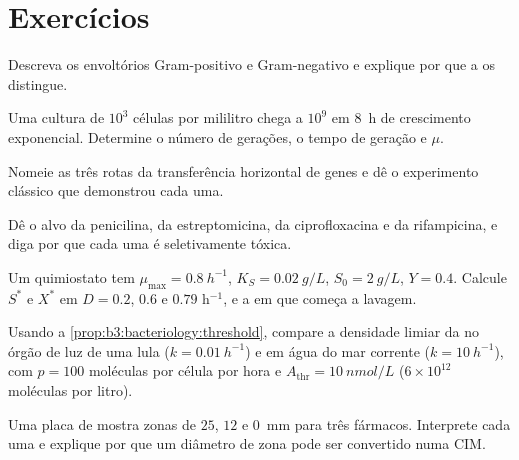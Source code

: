 \section{Exercícios}

\begin{exercise}[$\star$]\label{exo:b3:bacteriology:1}
Descreva os envoltórios Gram-positivo e Gram-negativo e explique por
que a  os distingue.
\end{exercise}

\begin{exercise}[$\star$]\label{exo:b3:bacteriology:2}
Uma cultura de $10^{3}$ células por mililitro chega a $10^{9}$ em
\qty{8}{h} de crescimento exponencial. Determine o número de gerações,
o tempo de geração e $\mu$.
\end{exercise}

\begin{exercise}[$\star$]\label{exo:b3:bacteriology:3}
Nomeie as três rotas da transferência horizontal de genes e dê o
experimento clássico que demonstrou cada uma.
\end{exercise}

\begin{exercise}[$\star$]\label{exo:b3:bacteriology:4}
Dê o alvo da penicilina, da estreptomicina, da ciprofloxacina e da
rifampicina, e diga por que cada uma é seletivamente tóxica.
\end{exercise}

\begin{exercise}[$\star\star$]\label{exo:b3:bacteriology:5}
Um quimiostato tem $\mu_{\max} = \qty{0.8}{h^{-1}}$,
$K_{S} =
\qty{0.02}{g/L}$, $S_{0} = \qty{2}{g/L}$, $Y = 0.4$. Calcule
$S^{*}$ e $X^{*}$ em $D = 0.2$, $0.6$ e $0.79$ h$^{-1}$, e a  em que começa a lavagem.
\end{exercise}

\begin{exercise}[$\star\star$]\label{exo:b3:bacteriology:6}
Usando a \cref{prop:b3:bacteriology:threshold}, compare a densidade
limiar da  no órgão de luz de uma lula
($k =
\qty{0.01}{h^{-1}}$) e em água do mar corrente
($k = \qty{10}{h^{-1}}$), com $p = 100$ moléculas por célula por hora e
$A_{\text{thr}} =
\qty{10}{nmol/L}$ ($6\times 10^{12}$ moléculas por
litro).
\end{exercise}

\begin{exercise}[$\star\star$]\label{exo:b3:bacteriology:7}
Uma placa de  mostra zonas de $25$, $12$ e
\qty{0}{mm} para três fármacos. Interprete cada uma e explique por que
um diâmetro de zona pode ser convertido numa CIM.
\end{exercise}

